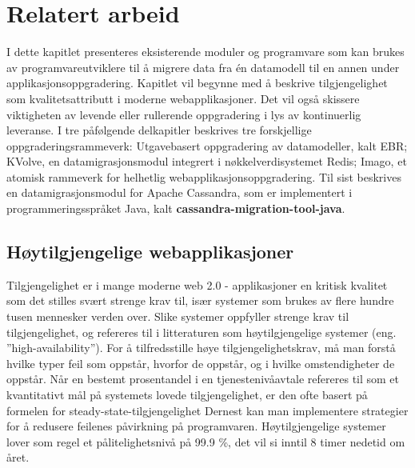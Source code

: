 
\chapter{Relatert arbeid}

I dette kapitlet presenteres eksisterende moduler og programvare som kan brukes av programvareutviklere til å migrere data fra én datamodell til en annen under applikasjonsoppgradering. Kapitlet vil begynne med å beskrive tilgjengelighet som kvalitetsattributt i moderne webapplikasjoner. Det vil også skissere viktigheten av  levende eller rullerende oppgradering i lys av kontinuerlig leveranse. I tre påfølgende delkapitler beskrives tre forskjellige oppgraderingsrammeverk: Utgavebasert oppgradering av datamodeller, kalt EBR; KVolve, en datamigrasjonsmodul integrert i nøkkelverdisystemet Redis; Imago, et atomisk rammeverk for helhetlig webapplikasjonsoppgradering. Til sist beskrives en datamigrasjonsmodul for Apache Cassandra, som er implementert i programmeringsspråket Java, kalt \textbf{cassandra-migration-tool-java}.

\section{Høytilgjengelige webapplikasjoner}

Tilgjengelighet er i mange moderne web 2.0 - applikasjoner en kritisk kvalitet som det stilles svært strenge krav til, især systemer som brukes av flere hundre tusen mennesker verden over. Slike systemer oppfyller strenge krav til tilgjengelighet, og refereres til i litteraturen som høytilgjengelige systemer (eng. ''high-availability''). For å tilfredsstille høye tilgjengelighetskrav, må man forstå hvilke typer feil som oppstår, hvorfor de oppstår, og i hvilke omstendigheter de oppstår. Når en bestemt prosentandel i en tjenestenivåavtale refereres til som et kvantitativt mål på systemets lovede tilgjengelighet, er den ofte basert på formelen for steady-state-tilgjengelighet  Dernest kan man implementere strategier for å redusere feilenes påvirkning på programvaren. Høytilgjengelige systemer lover som regel et pålitelighetsnivå på 99.9 \%, det vil si inntil 8 timer nedetid om året.








\cleardoublepage